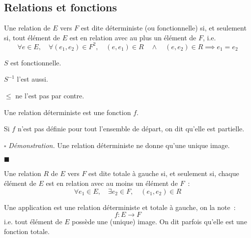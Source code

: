 \documentclass[a4paper, titlepage]{article}
\renewenvironment{proof}{\par$\square$ \footnotesize\textit{Démonstration.}}{\begin{flushright}$\blacksquare$\end{flushright}\par}
\begin{document}
    \subsection{Relations et fonctions}
    \begin{defn}
        Une relation de $E$ vers $F$ est dite déterministe (ou fonctionnelle) si, et seulement si, tout élément de $E$
        est en relation avec au plus un élément de $F$, i.e.
        $$ \forall e\in E,\quad\forall(e_1,e_2)\in F^2,\quad(e,e_1)\in R\quad\land\quad(e,e_2)\in R \implies e_1=e_2 $$
    \end{defn}
    \begin{exemple}
        $S$ est fonctionnelle.

        $S^{-1}$ l'est aussi.

        $\leqslant$ ne l'est pas par contre.
    \end{exemple}
    \begin{props}
        Une relation déterministe est une fonction $f$.

        Si $f$ n'est pas définie pour tout l'ensemble de départ, on dit qu'elle est partielle.
    \end{props}
    \begin{proof}
        Une relation déterministe ne donne qu'une unique image.
    \end{proof}
    \begin{defn}
        Une relation $R$ de $E$ vers $F$ est dite totale à gauche si, et seulement si, chaque élément de $E$ est en
        relation avec au moins un élément de $F$~:
        $$ \forall e_1\in E,\quad\exists e_2\in F,\quad (e_1,e_2)\in R $$
    \end{defn}
    \begin{defn}
        Une application est une relation déterministe et totale à gauche, on la note~:
        $$ f : E\to F $$
        i.e. tout élément de $E$ possède une (unique) image.
        On dit parfois qu'elle est une fonction totale.
    \end{defn}
\end{document}
